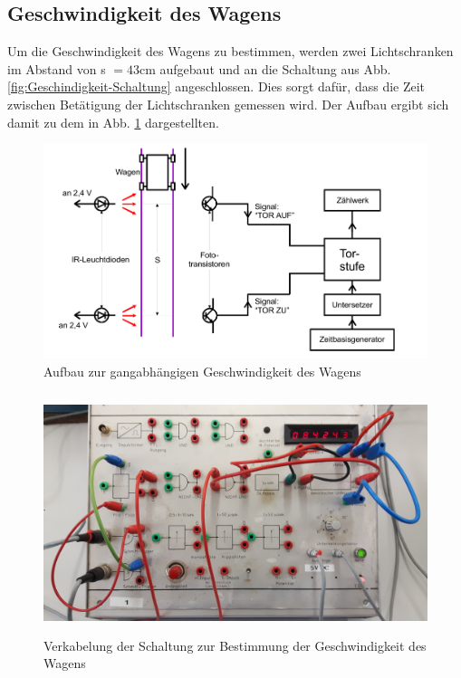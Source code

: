 \subsection{Geschwindigkeit des Wagens}
\label{sec:Geschwindigkeit}
Um die Geschwindigkeit des Wagens zu bestimmen, werden zwei Lichtschranken im Abstand von s $=43$cm aufgebaut und an die Schaltung aus Abb. \ref{fig:Geschindigkeit-Schaltung} angeschlossen. Dies sorgt dafür, dass die Zeit zwischen Betätigung der Lichtschranken gemessen wird. Der Aufbau ergibt sich damit zu dem in Abb. \ref{fig:Geschwindigkeit} dargestellten.
\begin{figure}
  \centering
  \includegraphics[width = \textwidth]{./Abbildungen/Geschwindigkeit.PNG}
  \caption{Aufbau zur gangabhängigen Geschwindigkeit des Wagens}
  \label{fig:Geschwindigkeit}
\end{figure}
\begin{figure}
  \centering
  \includegraphics[height = 7cm]{./Abbildungen/Geschwindigkeit-Schaltung.jpg}
  \caption{Verkabelung der Schaltung zur Bestimmung der Geschwindigkeit des Wagens}
  \label{fig:Geschwindigkeit-Schaltung}
\end{figure}

